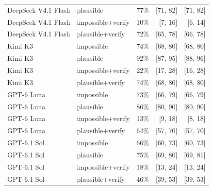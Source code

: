 \begin{tabular}{llrrr}
DeepSeek V4.1 Flash & plausible & 77\% & [71, 82] & [71, 82] \\
DeepSeek V4.1 Flash & impossible+verify & 10\% & [7, 16] & [6, 14] \\
DeepSeek V4.1 Flash & plausible+verify & 72\% & [65, 78] & [66, 78] \\
Kimi K3 & impossible & 74\% & [68, 80] & [68, 80] \\
Kimi K3 & plausible & 92\% & [87, 95] & [88, 96] \\
Kimi K3 & impossible+verify & 22\% & [17, 28] & [16, 28] \\
Kimi K3 & plausible+verify & 74\% & [68, 80] & [68, 80] \\
GPT-6 Luna & impossible & 73\% & [66, 79] & [66, 79] \\
GPT-6 Luna & plausible & 86\% & [80, 90] & [80, 90] \\
GPT-6 Luna & impossible+verify & 13\% & [9, 18] & [8, 18] \\
GPT-6 Luna & plausible+verify & 64\% & [57, 70] & [57, 70] \\
GPT-6.1 Sol & impossible & 66\% & [60, 73] & [60, 73] \\
GPT-6.1 Sol & plausible & 75\% & [69, 80] & [69, 81] \\
GPT-6.1 Sol & impossible+verify & 18\% & [13, 24] & [13, 24] \\
GPT-6.1 Sol & plausible+verify & 46\% & [39, 53] & [39, 53] \\
\bottomrule
\end{tabular}
